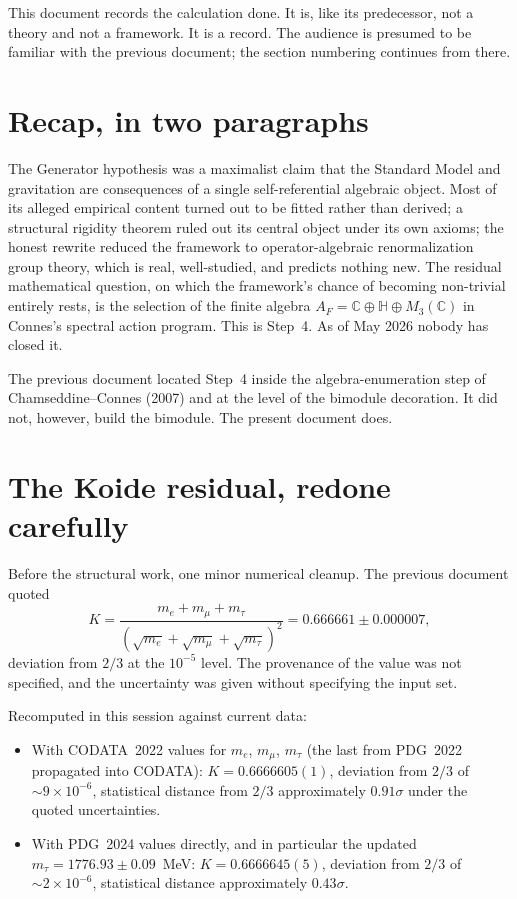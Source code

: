 \documentclass[11pt,a4paper]{article}
\begin{document}
This document records the calculation done. It is, like its predecessor, not a
theory and not a framework. It is a record. The audience is presumed to be
familiar with the previous document; the section numbering continues from there.

\section{Recap, in two paragraphs}

The Generator hypothesis was a maximalist claim that the Standard Model and
gravitation are consequences of a single self-referential algebraic object. Most
of its alleged empirical content turned out to be fitted rather than derived; a
structural rigidity theorem ruled out its central object under its own axioms;
the honest rewrite reduced the framework to operator-algebraic renormalization
group theory, which is real, well-studied, and predicts nothing new. The
residual mathematical question, on which the framework's chance of becoming
non-trivial entirely rests, is the selection of the finite algebra
$A_F = \mathbb{C} \oplus \mathbb{H} \oplus M_3(\mathbb{C})$ in Connes's spectral
action program. This is Step~4. As of May 2026 nobody has closed it.

The previous document located Step~4 inside the algebra-enumeration step of
Chamseddine--Connes (2007) and at the level of the bimodule decoration. It did
not, however, build the bimodule. The present document does.

\section{The Koide residual, redone carefully}\label{sec:koide}

Before the structural work, one minor numerical cleanup. The previous document
quoted
\[
  K = \frac{m_e + m_\mu + m_\tau}{(\sqrt{m_e}+\sqrt{m_\mu}+\sqrt{m_\tau})^2}
    = 0.666661 \pm 0.000007,
\]
deviation from $2/3$ at the $10^{-5}$ level. The provenance of the value was
not specified, and the uncertainty was given without specifying the input set.

Recomputed in this session against current data:
\begin{itemize}[leftmargin=2em]
  \item With CODATA~2022 values for $m_e$, $m_\mu$, $m_\tau$ (the last from
        PDG~2022 propagated into CODATA): $K = 0.6666605(1)$, deviation from
        $2/3$ of $\sim 9 \times 10^{-6}$, statistical distance from $2/3$
        approximately $0.91\sigma$ under the quoted uncertainties.
  \item With PDG~2024 values directly, and in particular the updated
        $m_\tau = 1776.93 \pm 0.09$~MeV: $K = 0.6666645(5)$, deviation from
        $2/3$ of $\sim 2 \times 10^{-6}$, statistical distance approximately
        $0.43\sigma$.
\end{itemize}
\end{document}
